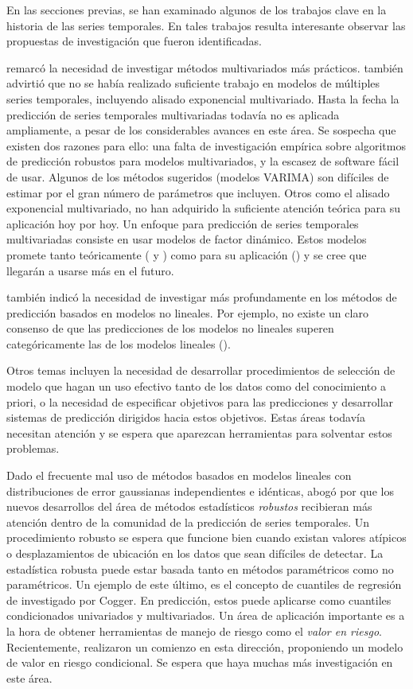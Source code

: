 \documentclass{llncs}
\begin{document}
En las secciones previas, se han examinado algunos de los trabajos clave en la historia de las series temporales. En tales trabajos resulta interesante observar las propuestas de investigación que fueron identificadas. 

\cite{Chatfield198819} remarcó la necesidad de investigar métodos multivariados más prácticos. \cite{Ord1988389} también advirtió que no se había realizado suficiente trabajo en modelos de múltiples series temporales, incluyendo alisado exponencial multivariado. Hasta la fecha la predicción de series temporales multivariadas todavía no es aplicada ampliamente, a pesar  de los considerables avances en este área. Se sospecha que existen dos razones para ello: una falta de investigación empírica sobre algoritmos de predicción robustos para modelos multivariados, y la escasez de software fácil de usar. Algunos de los métodos sugeridos (modelos VARIMA) son difíciles de estimar por el gran número de parámetros que incluyen. Otros como el alisado exponencial multivariado, no han adquirido la suficiente atención teórica para su aplicación hoy por hoy. Un enfoque para predicción de series temporales multivariadas consiste en usar modelos de factor dinámico. Estos modelos promete tanto teóricamente (\cite{Forni2005830} y \cite{Stock20021167}) como para su aplicación (\cite{Pena2004291}) y se cree que llegarán a usarse más en el futuro.

\cite{Ord1988389} también indicó la necesidad de investigar más profundamente en los métodos de predicción basados en modelos no lineales. Por ejemplo, no existe un claro consenso de que las predicciones de los modelos no lineales superen categóricamente las de los modelos lineales (\cite{Stock19991}). 

Otros temas incluyen la necesidad de desarrollar procedimientos de selección de modelo que hagan un uso efectivo tanto de los datos como del conocimiento a priori, o la necesidad de especificar objetivos para las predicciones y desarrollar sistemas de predicción dirigidos hacia estos objetivos. Estas áreas todavía necesitan atención y se espera que aparezcan herramientas para solventar estos problemas. %

Dado el frecuente mal uso de métodos basados en modelos lineales con distribuciones de error gaussianas independientes e idénticas, \cite{Cogger1988403} abogó por que los nuevos desarrollos del área de métodos estadísticos \emph{robustos} recibieran más atención dentro de la comunidad de la predicción de series temporales. Un procedimiento robusto se espera que funcione bien cuando existan valores atípicos o desplazamientos de ubicación en los datos que sean difíciles de detectar. La estadística robusta puede estar basada tanto en métodos paramétricos como no paramétricos. Un ejemplo de este último, es el concepto de cuantiles de regresión de \cite{Koenker197833} investigado por Cogger. En predicción, estos puede aplicarse como cuantiles condicionados univariados y multivariados. Un área de aplicación importante es a la hora de obtener herramientas de manejo de riesgo como el \emph{valor en riesgo}. Recientemente, \cite{Engle2004367} realizaron un comienzo en esta dirección, proponiendo un modelo de valor en riesgo condicional. Se espera que haya muchas más investigación en este área.
\end{document}
